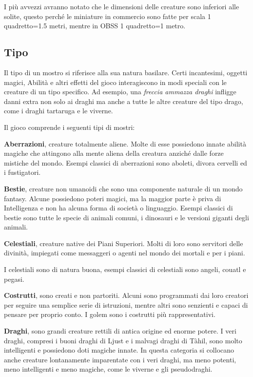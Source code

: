 I più avvezzi avranno notato che le dimensioni delle creature sono inferiori alle solite, questo perché le miniature in commercio sono fatte per scala 1 quadretto=1.5 metri, mentre in OBSS 1 quadretto=1 metro.

\begin{multicols}{2}

\subsection{Tipo}

Il tipo di un mostro si riferisce alla sua natura basilare. Certi incantesimi, oggetti magici, Abilità e altri effetti del gioco interagiscono in modi speciali con le creature di un tipo specifico. Ad esempio, una \emph{freccia ammazza draghi} infligge danni extra non solo ai draghi ma anche a tutte le altre creature del tipo drago, come i draghi tartaruga e le viverne.

Il gioco comprende i seguenti tipi di mostri:

\smallskip\textbf{Aberrazioni}, creature totalmente aliene. Molte di esse possiedono innate abilità magiche che attingono alla mente aliena della creatura anziché dalle forze mistiche del mondo. Esempi classici di aberrazioni sono aboleti, divora cervelli ed i fustigatori.

\smallskip\textbf{Bestie}, creature non umanoidi che sono una componente naturale di un mondo fantasy. Alcune possiedono poteri magici, ma la maggior parte è priva di Intelligenza e non ha alcuna forma di società o linguaggio. Esempi classici di bestie sono tutte le specie di animali comuni, i dinosauri e le versioni giganti degli animali.

\smallskip\textbf{Celestiali}, creature native dei Piani Superiori. Molti di loro sono servitori delle divinità, impiegati come messaggeri o agenti nel mondo dei mortali e per i piani.

\medskip

I celestiali sono di natura buona, esempi classici di celestiali sono angeli, couatl e pegasi.

\smallskip\textbf{Costrutti}, sono creati e non partoriti. Alcuni sono programmati dai loro creatori per seguire una semplice serie di istruzioni, mentre altri sono senzienti e capaci di pensare per proprio conto. I golem sono i costrutti più rappresentativi.

\smallskip\textbf{Draghi}, sono grandi creature rettili di antica origine ed enorme potere. I veri draghi, compresi i buoni draghi di Ljust e i malvagi draghi di Tàhil, sono molto intelligenti e possiedono doti magiche innate. In questa categoria si collocano anche creature lontanamente imparentate con i veri draghi, ma meno potenti, meno intelligenti e meno magiche, come le viverne e gli pseudodraghi.


\end{multicols}
